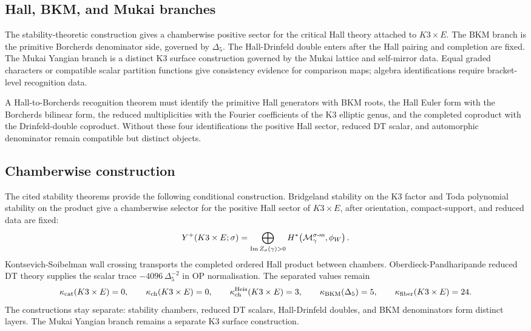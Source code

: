 \subsection*{Hall, BKM, and Mukai branches}

The stability-theoretic construction gives a chamberwise positive sector
for the critical Hall theory attached to $K3\times E$.  The BKM branch
is the primitive Borcherds denominator side, governed by $\Delta_5$.
The Hall-Drinfeld double enters after the Hall pairing and completion
are fixed.  The Mukai Yangian branch is a distinct K3 surface
construction governed by the Mukai lattice and self-mirror data.  Equal
graded characters or compatible scalar partition functions give
consistency evidence for comparison maps; algebra identifications
require bracket-level recognition data.

A Hall-to-Borcherds recognition theorem must identify the primitive Hall
generators with BKM roots, the Hall Euler form with the Borcherds
bilinear form, the reduced multiplicities with the Fourier coefficients
of the K3 elliptic genus, and the completed coproduct with the
Drinfeld-double coproduct.  Without these four identifications the
positive Hall sector, reduced DT scalar, and automorphic denominator
remain compatible but distinct objects.

\subsection*{Chamberwise construction}

The cited stability theorems provide the following conditional
construction.  Bridgeland stability on the K3 factor and Toda polynomial
stability on the product give a chamberwise selector for the positive
Hall sector of $K3\times E$, after orientation, compact-support, and
reduced data are fixed:
\[
  Y^{+}(K3\times E;\sigma)
  =
  \bigoplus_{\operatorname{Im}Z_\sigma(\gamma)>0}
  H^{*}\!\left(\mathcal{M}_\gamma^{\sigma\text{-ss}},\phi_W\right).
\]
Kontsevich-Soibelman wall crossing transports the completed ordered
Hall product between chambers.  Oberdieck-Pandharipande reduced DT
theory supplies the scalar trace
$-4096\,\Delta_5^{-2}$ in OP normalisation.  The separated values remain
\[
  \kappa_{\mathrm{cat}}(K3\times E)=0,\qquad
  \kappa_{\mathrm{ch}}(K3\times E)=0,\qquad
  \kappa_{\mathrm{ch}}^{\mathrm{Heis}}(K3\times E)=3,\qquad
  \kappa_{\mathrm{BKM}}(\Delta_5)=5,\qquad
  \kappa_{\mathrm{fiber}}(K3\times E)=24.
\]
The constructions stay separate: stability chambers, reduced DT scalars,
Hall-Drinfeld doubles, and BKM denominators form distinct layers.  The
Mukai Yangian branch remains a separate K3 surface construction.
